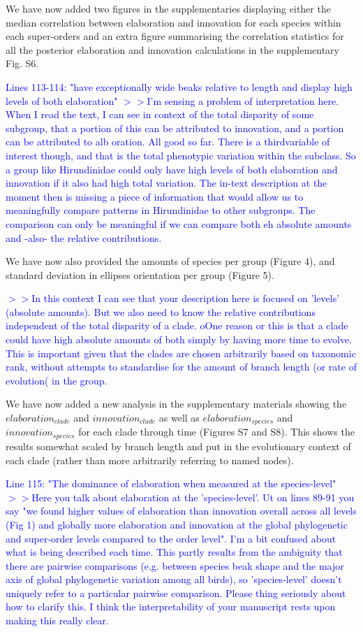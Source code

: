 \documentclass[12pt,letterpaper]{article}
\begin{document}
{We have now added two figures in the supplementaries displaying either the median correlation between elaboration and innovation for each species within each super-orders and an extra figure summarising the correlation statistics for all the posterior elaboration and innovation calculations in the supplementary Fig. S6.

\textcolor{blue}{Lines 113-114: "have exceptionally wide beaks relative to length and display high levels of both elaboration"
$>>$I'm sensing a problem of interpretation here. When I read the text, I can see in context of the total disparity of some subgroup, that a portion of this can be attributed to innovation, and a portion can be attributed to alb oration. All good so far. There is a thirdvariable of interest though, and that is the total phenotypic variation within the subclass. So a group like Hirundinidae could only have high levels of both elaboration and innovation if it also had high total variation. The in-text description at the moment then is missing a piece of information that would allow us to meaningfully compare patterns in Hirundinidae to other subgroups. The comparison can only be meaningful if we can compare both eh absolute amounts and -also- the relative contributions.}

We have now also provided the amounts of species per group (Figure 4), and standard deviation in ellipses orientation per group (Figure 5). 

\textcolor{blue}{$>>$In this context I can see that your description here is focused on 'levels' (absolute amounts). But we also need to know the relative contributions independent of the total disparity of a clade. oOne reason or this is that a clade could have high absolute amounts of both simply by having more time to evolve. This is important given that the clades are chosen arbitrarily based on taxonomic rank, without attempts to standardise for the amount of branch length (or rate of evolution( in the group.}

We have now added a new analysis in the supplementary materials showing the $elaboration_{clade}$ and $innovation_{clade}$ as well as $elaboration_{species}$ and $innovation_{species}$ for each clade through time (Figures S7 and S8). This shows the results somewhat scaled by branch length and put in the evolutionary context of each clade (rather than more arbitrarily referring to named nodes).

\textcolor{blue}{Line 115: "The dominance of elaboration when measured at the species-level"
$>>$Here you talk about elaboration at the 'species-level'. Ut on lines 89-91 you say "we found higher values of elaboration than innovation overall across all levels (Fig 1) and globally more elaboration and innovation at the global phylogenetic and super-order levels compared to the order level". I'm a bit confused about what is being described each time. This partly results from the ambiguity that there are pairwise comparisons (e.g. between species beak shape and the major axis of global phylogenetic variation among all birds), so 'species-level' doesn't uniquely refer to a particular pairwise comparison. Please thing seriously about how to clarify this. I think the interpretability of your manuscript rests upon making this really clear.}

}
\end{document}
